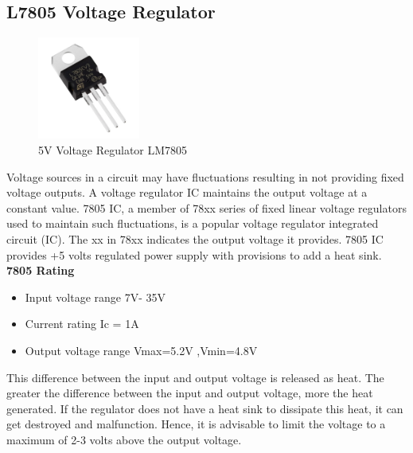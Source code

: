 \subsection{L7805 Voltage Regulator}

\begin{figure}
	\includegraphics[width=0.3\textwidth]{photos/theory/lm7805.jpg}
	\caption{5V Voltage Regulator LM7805}
\end{figure}

Voltage sources in a circuit may have fluctuations resulting in not providing fixed voltage outputs. A voltage regulator IC maintains the output voltage at a constant value. 7805 IC, a member of 78xx series of fixed linear voltage regulators used to maintain such fluctuations, is a popular voltage regulator integrated circuit (IC). The xx in 78xx indicates the output voltage it provides. 7805 IC provides +5 volts regulated power supply with provisions to add a heat sink.\\

\textbf{7805 Rating}
\begin{itemize}
	\item Input voltage range 7V- 35V
	\item Current rating Ic = 1A
	\item Output voltage range   V{max}=5.2V ,V{min}=4.8V
\end{itemize}

This difference between the input and output voltage is released as heat. The greater the difference between the input and output voltage, more the heat generated. If the regulator does not have a heat sink to dissipate this heat, it can get destroyed and malfunction. Hence, it is advisable to limit the voltage to a maximum of 2-3 volts above the output voltage.

